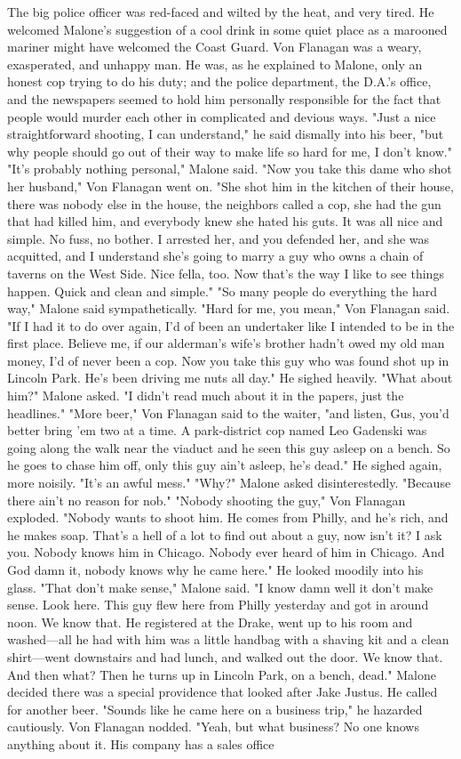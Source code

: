 \documentclass{novel}
\begin{document}
The big police officer was red-faced and wilted by the heat, and very tired. He welcomed Malone's suggestion of a cool drink in some quiet place as a marooned mariner might have welcomed the Coast Guard. Von Flanagan was a weary, exasperated, and unhappy man. He was, as he explained to Malone, only an honest cop trying to do his duty; and the police department, the D.A.'s office, and the newspapers seemed to hold him personally responsible for the fact that people would murder each other in complicated and devious ways. "Just a nice straightforward shooting, I can understand," he said dismally into his beer, "but why people should go out of their way to make life so hard for me, I don't know." "It's probably nothing personal," Malone said. "Now you take this dame who shot her husband," Von Flanagan went on. "She shot him in the kitchen of their house, there was nobody else in the house, the neighbors called a cop, she had the gun that had killed him, and everybody knew she hated his guts. It was all nice and simple. No fuss, no bother. I arrested her, and you defended her, and she was acquitted, and I understand she's going to marry a guy who owns a chain of taverns on the West Side. Nice fella, too. Now that's the way I like to see things happen. Quick and clean and simple." "So many people do everything the hard way," Malone said sympathetically. "Hard for me, you mean," Von Flanagan said. "If I had it to do over again, I'd of been an undertaker like I intended to be in the first place. Believe me, if our alderman's wife's brother hadn't owed my old man money, I'd of never been a cop. Now you take this guy who was found shot up in Lincoln Park. He's been driving me nuts all day." He sighed heavily. "What about him?" Malone asked. "I didn't read much about it in the papers, just the headlines." "More beer," Von Flanagan said to the waiter, "and listen, Gus, you'd better bring 'em two at a time. A park-district cop named Leo Gadenski was going along the walk near the viaduct and he seen this guy asleep on a bench. So he goes to chase him off, only this guy ain't asleep, he's dead." He sighed again, more noisily. "It's an awful mess." "Why?" Malone asked disinterestedly. "Because there ain't no reason for nob." "Nobody shooting the guy," Von Flanagan exploded. "Nobody wants to shoot him. He comes from Philly, and he's rich, and he makes soap. That's a hell of a lot to find out about a guy, now isn't it? I ask you. Nobody knows him in Chicago. Nobody ever heard of him in Chicago. And God damn it, nobody knows why he came here." He looked moodily into his glass. "That don't make sense," Malone said. "I know damn well it don't make sense. Look here. This guy flew here from Philly yesterday and got in around noon. We know that. He registered at the Drake, went up to his room and washed—all he had with him was a little handbag with a shaving kit and a clean shirt—went downstairs and had lunch, and walked out the door. We know that. And then what? Then he turns up in Lincoln Park, on a bench, dead." Malone decided there was a special providence that looked after Jake Justus. He called for another beer. "Sounds like he came here on a business trip," he hazarded cautiously. Von Flanagan nodded. "Yeah, but what business? No one knows anything about it. His company has a sales office 
\end{document}
